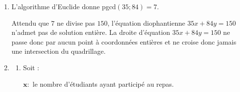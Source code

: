 \begin{enumerate}[label=\thechapter.\arabic*, font=\bfseries, itemsep=7mm,labelsep*=3mm,left=0mm]

\medskip
Soit alors $(x,y)$ une solution quelconque de l'équation $1665x+1035y=45$. Comme $(x_0,y_0)$ est aussi solution, nous avons $1665x_0+1035y_0=45$. En faisant la différence de ces deux égalités nous obtenons :

$$1665(x-x_0)+1035(y-y_0)=0 \quad\ssi$$
$$1665(x-x_0)=-1035(y-y_0) \quad\overset{:45}{\ssi}$$
$$37(x-x_0)=-23(y-y_0) \quad (*)$$

\medskip
On en déduit que $37\ |\ -23 (y-y_0)$ et comme pgcd$(37;23)=1$ le lemme de Gauss assure que
$37\ |\ (y -y_0)$ (c'est ici qu'il est important d'avoir divisé par $45$!).

\medskip
Cela nous permet d'écrire $y-y_0 = 37 k$ pour un $k \in \Z$. Repartant de l'égalité $(*)$ nous obtenons alors  : $37(x-x_0)=-23 \cdot 37 \cdot k$.
Ce qui donne $x-x_0 = -23 k$.

\medskip
Donc si $(x,y)$ est solution de $(E)$ alors elle est de la forme :
$(x,y)= (x_0 - 23k,y_0+37k)$, avec $k \in \Z$.

Réciproquement pour chaque  $k\in\Z$, si $(x,y)$ est de cette forme alors c'est une solution de $(E)$
(vérifiez-le !).\\
Finalement  :
$$S=\big\lbrace (5 - 23k,-8+37k) \mid k\in \Z\big\rbrace.$$



\item
L'algorithme d'Euclide donne pgcd$(35;84)=7$.

\medskip
Attendu que $7$ ne divise pas $150$, l'équation diophantienne $35x+84y=150$ n'admet pas de solution entière. La droite d'équation $35x+84y=150$ ne passe donc par aucun point à coordonnées entières et ne croise donc jamais une intersection du quadrillage.




\item
\begin{enumerate}[label=\alph*),itemsep=5mm,left=-1mm,labelsep*=2mm]
\item Soit : \begin{minipage}[t]{0.9\textwidth}
$\boldsymbol{x} :$ le nombre d'étudiants ayant participé au repas.


\end{minipage}
\end{enumerate}
\end{enumerate}
